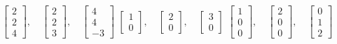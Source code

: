 \documentclass{ximera}
\begin{document}
\begin{exercise}
\begin{tasks}
        \task
        $\begin{bmatrix}
        2 \\ 2 \\ 4
        \end{bmatrix}
        , \quad
        \begin{bmatrix}
        2 \\ 2 \\ 3
        \end{bmatrix}
        , \quad
        \begin{bmatrix}
        4 \\ 4 \\ -3
        \end{bmatrix}$
        \task
        $\begin{bmatrix}
        1 \\ 0
        \end{bmatrix}
        , \quad
        \begin{bmatrix}
        2 \\ 0
        \end{bmatrix}
        , \quad
        \begin{bmatrix}
        3 \\ 0
        \end{bmatrix}$
        \task
        $\begin{bmatrix}
        1 \\ 0 \\ 0
        \end{bmatrix}
        , \quad
        \begin{bmatrix}
        2 \\ 0 \\ 0
        \end{bmatrix}
        , \quad
        \begin{bmatrix}
        0 \\ 1 \\ 2
        \end{bmatrix}$
    \end{tasks}
\end{exercise}
\end{document}
